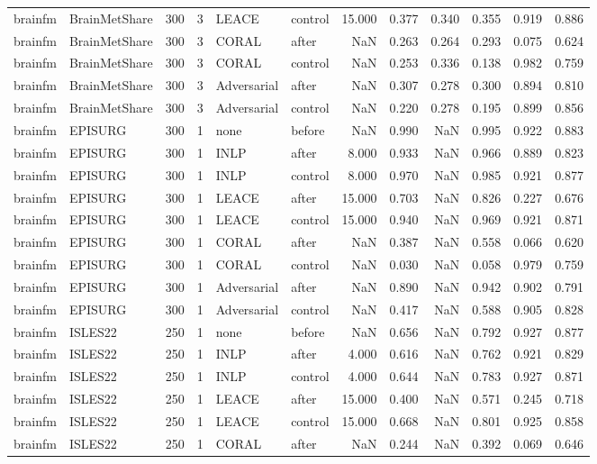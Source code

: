 \begin{tabular}{llrrllrrrrrr}
brainfm & BrainMetShare & 300 & 3 & LEACE & control & 15.000 & 0.377 & 0.340 & 0.355 & 0.919 & 0.886 \\
brainfm & BrainMetShare & 300 & 3 & CORAL & after & NaN & 0.263 & 0.264 & 0.293 & 0.075 & 0.624 \\
brainfm & BrainMetShare & 300 & 3 & CORAL & control & NaN & 0.253 & 0.336 & 0.138 & 0.982 & 0.759 \\
brainfm & BrainMetShare & 300 & 3 & Adversarial & after & NaN & 0.307 & 0.278 & 0.300 & 0.894 & 0.810 \\
brainfm & BrainMetShare & 300 & 3 & Adversarial & control & NaN & 0.220 & 0.278 & 0.195 & 0.899 & 0.856 \\
brainfm & EPISURG & 300 & 1 & none & before & NaN & 0.990 & NaN & 0.995 & 0.922 & 0.883 \\
brainfm & EPISURG & 300 & 1 & INLP & after & 8.000 & 0.933 & NaN & 0.966 & 0.889 & 0.823 \\
brainfm & EPISURG & 300 & 1 & INLP & control & 8.000 & 0.970 & NaN & 0.985 & 0.921 & 0.877 \\
brainfm & EPISURG & 300 & 1 & LEACE & after & 15.000 & 0.703 & NaN & 0.826 & 0.227 & 0.676 \\
brainfm & EPISURG & 300 & 1 & LEACE & control & 15.000 & 0.940 & NaN & 0.969 & 0.921 & 0.871 \\
brainfm & EPISURG & 300 & 1 & CORAL & after & NaN & 0.387 & NaN & 0.558 & 0.066 & 0.620 \\
brainfm & EPISURG & 300 & 1 & CORAL & control & NaN & 0.030 & NaN & 0.058 & 0.979 & 0.759 \\
brainfm & EPISURG & 300 & 1 & Adversarial & after & NaN & 0.890 & NaN & 0.942 & 0.902 & 0.791 \\
brainfm & EPISURG & 300 & 1 & Adversarial & control & NaN & 0.417 & NaN & 0.588 & 0.905 & 0.828 \\
brainfm & ISLES22 & 250 & 1 & none & before & NaN & 0.656 & NaN & 0.792 & 0.927 & 0.877 \\
brainfm & ISLES22 & 250 & 1 & INLP & after & 4.000 & 0.616 & NaN & 0.762 & 0.921 & 0.829 \\
brainfm & ISLES22 & 250 & 1 & INLP & control & 4.000 & 0.644 & NaN & 0.783 & 0.927 & 0.871 \\
brainfm & ISLES22 & 250 & 1 & LEACE & after & 15.000 & 0.400 & NaN & 0.571 & 0.245 & 0.718 \\
brainfm & ISLES22 & 250 & 1 & LEACE & control & 15.000 & 0.668 & NaN & 0.801 & 0.925 & 0.858 \\
brainfm & ISLES22 & 250 & 1 & CORAL & after & NaN & 0.244 & NaN & 0.392 & 0.069 & 0.646 \\

\end{tabular}
